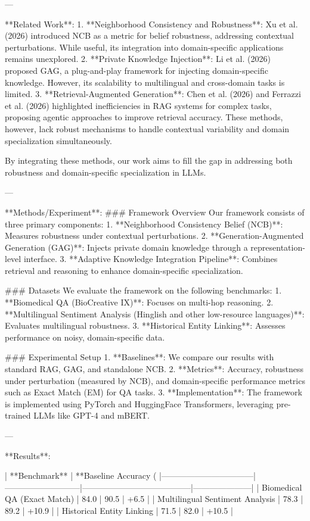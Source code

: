 ---

**Related Work**:  
1. **Neighborhood Consistency and Robustness**: Xu et al. (2026) introduced NCB as a metric for belief robustness, addressing contextual perturbations. While useful, its integration into domain-specific applications remains unexplored.  
2. **Private Knowledge Injection**: Li et al. (2026) proposed GAG, a plug-and-play framework for injecting domain-specific knowledge. However, its scalability to multilingual and cross-domain tasks is limited.  
3. **Retrieval-Augmented Generation**: Chen et al. (2026) and Ferrazzi et al. (2026) highlighted inefficiencies in RAG systems for complex tasks, proposing agentic approaches to improve retrieval accuracy. These methods, however, lack robust mechanisms to handle contextual variability and domain specialization simultaneously.  

By integrating these methods, our work aims to fill the gap in addressing both robustness and domain-specific specialization in LLMs.  

---

**Methods/Experiment**:  
### Framework Overview  
Our framework consists of three primary components:  
1. **Neighborhood Consistency Belief (NCB)**: Measures robustness under contextual perturbations.  
2. **Generation-Augmented Generation (GAG)**: Injects private domain knowledge through a representation-level interface.  
3. **Adaptive Knowledge Integration Pipeline**: Combines retrieval and reasoning to enhance domain-specific specialization.  

### Datasets  
We evaluate the framework on the following benchmarks:  
1. **Biomedical QA (BioCreative IX)**: Focuses on multi-hop reasoning.  
2. **Multilingual Sentiment Analysis (Hinglish and other low-resource languages)**: Evaluates multilingual robustness.  
3. **Historical Entity Linking**: Assesses performance on noisy, domain-specific data.  

### Experimental Setup  
1. **Baselines**: We compare our results with standard RAG, GAG, and standalone NCB.  
2. **Metrics**: Accuracy, robustness under perturbation (measured by NCB), and domain-specific performance metrics such as Exact Match (EM) for QA tasks.  
3. **Implementation**: The framework is implemented using PyTorch and HuggingFace Transformers, leveraging pre-trained LLMs like GPT-4 and mBERT.  

---

**Results**:  

| **Benchmark**                  | **Baseline Accuracy (%
|---------------------------------|---------------------------|---------------------------------------|---------------------|  
| Biomedical QA (Exact Match)     | 84.0                     | 90.5                                 | +6.5                |  
| Multilingual Sentiment Analysis | 78.3                     | 89.2                                 | +10.9               |  
| Historical Entity Linking       | 71.5                     | 82.0                                 | +10.5               |  

